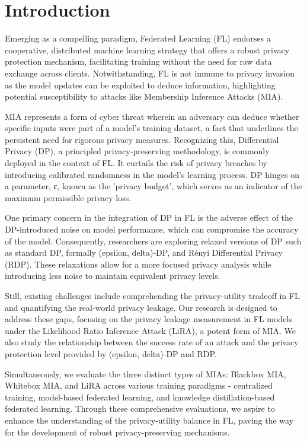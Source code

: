 \section{Introduction}

Emerging as a compelling paradigm, Federated Learning (FL) endorses a cooperative, distributed machine learning strategy that offers a robust privacy protection mechanism, facilitating training without the need for raw data exchange across clients. Notwithstanding, FL is not immune to privacy invasion as the model updates can be exploited to deduce information, highlighting potential susceptibility to attacks like Membership Inference Attacks (MIA).

MIA represents a form of cyber threat wherein an adversary can deduce whether specific inputs were part of a model's training dataset, a fact that underlines the persistent need for rigorous privacy measures. Recognizing this, Differential Privacy (DP), a principled privacy-preserving methodology, is commonly deployed in the context of FL. It curtails the risk of privacy breaches by introducing calibrated randomness in the model's learning process. DP hinges on a parameter, ε, known as the 'privacy budget', which serves as an indicator of the maximum permissible privacy loss.

One primary concern in the integration of DP in FL is the adverse effect of the DP-introduced noise on model performance, which can compromise the accuracy of the model. Consequently, researchers are exploring relaxed versions of DP such as standard DP, formally (epsilon, delta)-DP, and Rényi Differential Privacy (RDP). These relaxations allow for a more focused privacy analysis while introducing less noise to maintain equivalent privacy levels.

Still, existing challenges include comprehending the privacy-utility tradeoff in FL and quantifying the real-world privacy leakage. Our research is designed to address these gaps, focusing on the privacy leakage measurement in FL models under the Likelihood Ratio Inference Attack (LiRA), a potent form of MIA. We also study the relationship between the success rate of an attack and the privacy protection level provided by (epsilon, delta)-DP and RDP.

Simultaneously, we evaluate the three distinct types of MIAs: Blackbox MIA, Whitebox MIA, and LiRA across various training paradigms - centralized training, model-based federated learning, and knowledge distillation-based federated learning. Through these comprehensive evaluations, we aspire to enhance the understanding of the privacy-utility balance in FL, paving the way for the development of robust privacy-preserving mechanisms.

